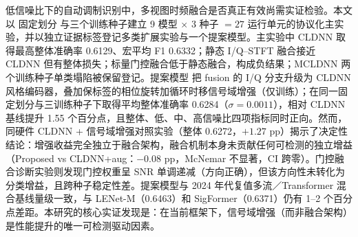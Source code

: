 \begin{cnabstract}
低信噪比下的自动调制识别中，多视图时频融合是否真正有效尚需实证检验。本文以 \datasetname{} 固定划分 \splitname{} 与三个训练种子建立 9 模型 \(\times\) 3 种子 \(=27\) 运行单元的协议化主实验，并以独立证据标签登记多类扩展实验与一个提案模型。主实验中 CLDNN 取得最高整体准确率 0.6129、宏平均 F1 0.6332；静态 I/Q--STFT 融合接近 CLDNN 但有整体损失；标量门控融合低于静态融合，构成负结果；MCLDNN 两个训练种子单类塌陷被保留登记。提案模型  把 fusion 的 I/Q 分支升级为 CLDNN 风格编码器，叠加保标签的相位旋转加循环时移信号域增强（仅训练）；在同一固定划分与三训练种子下取得平均整体准确率 0.6284（\(\sigma=0.0011\)），相对 CLDNN 基线提升 1.55 个百分点，且整体、低、中、高信噪比四项指标同时正向。然而，同硬件 CLDNN + 信号域增强对照实验（整体 0.6272，$+1.27$ pp）揭示了决定性结论：增强收益完全独立于融合架构，融合机制本身未贡献任何可检测的独立增益（Proposed vs CLDNN+aug：$-0.08$ pp，McNemar 不显著，CI 跨零）。门控融合诊断实验则发现门控权重呈 SNR 单调递减（方向正确），但该方向性未转化为分类增益，且跨种子稳定性差。提案模型与 2024 年代复值多流／Transformer 混合基线量级一致，与 LENet-M（0.6463）和 SigFormer（0.6371）仍有 1--2 个百分点差距。本研究的核心实证发现是：在当前框架下，信号域增强（而非融合架构）是性能提升的唯一可检测驱动因素。
\end{cnabstract}
